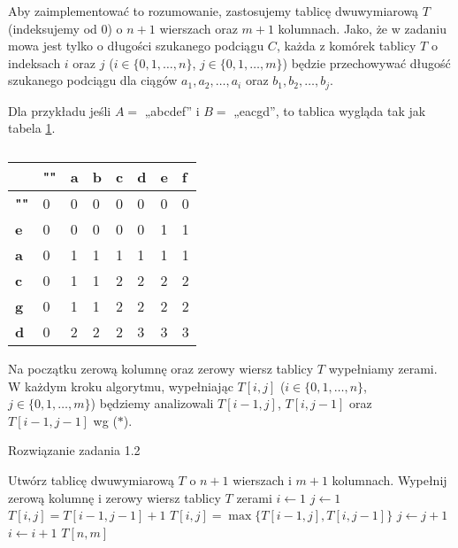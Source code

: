 Aby zaimplementować to rozumowanie, zastosujemy tablicę dwuwymiarową $T$ 
(indeksujemy od 0)
o $n+1$ wierszach oraz $m+1$ kolumnach. Jako, że w zadaniu mowa jest 
tylko o długości szukanego podciągu $C$, każda z komórek tablicy $T$ 
o indeksach $i$ oraz $j$ ($i \in \{0,1, \dots, n\}$, 
$j \in \{0,1, \dots, m\}$) będzie 
przechowywać długość szukanego podciągu dla ciągów 
$a_1, a_2, \dots, a_i$ oraz $b_1, b_2, \dots, b_j$. 

Dla przykładu 
jeśli $A = $ „abcdef” i  $B = $ „eacgd”, to tablica 
wygląda tak jak tabela \ref{tab_zad12}.


\begin{table}[H]
	\center
	\begin{tabular}{|l|lllllll|}
		\hline
		& \multicolumn{1}{l|}{\textbf{""}} & \multicolumn{1}{l|}{\textbf{a}} & \multicolumn{1}{l|}{\textbf{b}} & \multicolumn{1}{l|}{\textbf{c}} & \multicolumn{1}{l|}{\textbf{d}} & \multicolumn{1}{l|}{\textbf{e}} & \multicolumn{1}{l|}{\textbf{f}} \\ \hline
		\textbf{""} & 0 & 0 & 0 & 0 & 0 & 0 & 0 \\ \cline{1-1}
		\textbf{e}  & 0 & 0 & 0 & 0 & 0 & 1 & 1 \\ \cline{1-1}
		\textbf{a}  & 0 & 1 & 1 & 1 & 1 & 1 & 1 \\ \cline{1-1}
		\textbf{c}  & 0 & 1 & 1 & 2 & 2 & 2 & 2 \\ \cline{1-1}
		\textbf{g}  & 0 & 1 & 1 & 2 & 2 & 2 & 2 \\ \cline{1-1}
		\textbf{d}  & 0 & 2 & 2 & 2 & 3 & 3 & 3 \\ \cline{1-1}
		\hline
	\end{tabular}
	\caption{}
	\label{tab_zad12}
\end{table}

Na początku zerową kolumnę oraz zerowy wiersz tablicy $T$
wypełniamy zerami. W każdym kroku algorytmu, wypełniając $T[i, j]$
($i \in \{0,1, \dots, n\}$, $j \in \{0,1, \dots, m\}$)
będziemy analizowali $T[i-1, j]$, $T[i, j-1]$ oraz $T[i-1,j-1]$ wg ($\ast$).


\begin{algorithm}[H]
	\caption{Rozwiązanie zadania 1.2}\label{Zadanie12}
	\begin{algorithmic}[1]
		\State Utwórz tablicę dwuwymiarową $T$ o $n+1$ wierszach i $m+1$ kolumnach.
		\State Wypełnij zerową kolumnę i zerowy wiersz tablicy $T$ zerami
		\State $i \gets 1$
		\State $j \gets 1$
		\State $T[i, j] = T[i-1,j-1] + 1$
		\Else
		\State $T[i, j] = \max\{T[i-1,j], T[i,j-1]\}$
		\EndIf
		\State $j \gets j + 1$
		\EndWhile
		\State $i \gets i + 1$
		\EndWhile
		\State \Return $T[n, m]$
		\EndProcedure 
	\end{algorithmic}
\end{algorithm}


